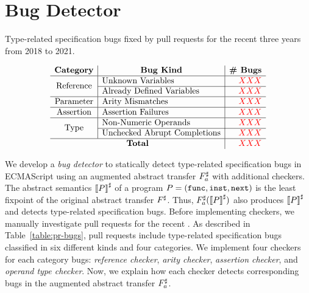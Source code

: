 \section{Bug Detector}\label{sec:checker}

\begin{table}
  \centering
  \caption{Type-related specification bugs fixed by pull requests for the recent
  three years from 2018 to 2021.}
  \label{table:pr-bugs}
  \vspace*{-1.5em}
  \[
    \begin{array}{c|l|r}
      \multicolumn{1}{c}{\textbf{Category}} &
      \multicolumn{1}{|c}{\textbf{Bug Kind}} &
      \multicolumn{1}{|c}{\textbf{\# Bugs}}\\
      \hline

      \multirow{2}{*}{\text{Reference}}
      & \text{Unknown Variables} & \inred{XXX}\\\cline{2-3}
      & \text{Already Defined Variables} & \inred{XXX}\\\hline

      \multirow{1}{*}{\text{Parameter}}
      & \text{Arity Mismatches} & \inred{XXX}\\\hline

      \multirow{1}{*}{\text{Assertion}}
      & \text{Assertion Failures} & \inred{XXX}\\\hline

      \multirow{2}{*}{\text{Type}}
      & \text{Non-Numeric Operands} & \inred{XXX}\\\cline{2-3}
      & \text{Unchecked Abrupt Completions} & \inred{XXX}\\\hline

      \multicolumn{2}{c|}{\textbf{Total}} & \inred{XXX}\\

    \end{array}
  \]
  \vspace*{-1.5em}
\end{table}


We develop a \textit{bug detector} to statically detect type-related
specification bugs in ECMAScript using an augmented abstract transfer
${F}^\sharp_a$ with additional checkers.  The abstract semantics ${\llbracket{P}\rrbracket}^\sharp$ of
a program $P = (\mathtt{func}, \mathtt{inst}, \mathtt{next})$ is the least fixpoint of the
original abstract transfer ${F}^\sharp$.  Thus, ${F}^\sharp_a({\llbracket{P}\rrbracket}^\sharp)$ also
produces ${\llbracket{P}\rrbracket}^\sharp$ and detects type-related specification bugs.  Before
implementing checkers, we manually investigate pull requests for the recent
.  As described in
Table~\ref{table:pr-bugs}, pull requests include  type-related
specification bugs classified in six different kinds and four categories.  We
implement four checkers for each category bugs: \textit{reference checker},
\textit{arity checker}, \textit{assertion checker}, and \textit{operand type
checker}.  Now, we explain how each checker detects corresponding bugs in the
augmented abstract transfer ${F}^\sharp_a$.


